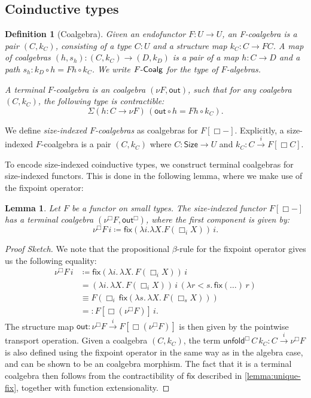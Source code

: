 \documentclass[10pt,a4paper]{article}
\newtheorem{lemma}[theorem]{Lemma}
\newtheorem{definition}[theorem]{Definition}
\theoremstyle{definition}
\theoremstyle{remark}
\renewcommand{\.}{.\,} %
\renewcommand{\:}{:} %
\newcommand{\Size}{\mathsf{Size}}
\newcommand{\fix}{\mathsf{fix}}
\newcommand{\unfold}{\mathsf{unfold}}
\newcommand{\FCoalg}{F\text-\sf{Coalg}}
\newcommand{\sFCoalg}{F[\Box{-}]\text-\sf{CoAlg}}
\newcommand{\out}{\mathsf{out}}
\newcommand{\sto}{\overset{i}{\to}}
\newcommand{\0}{\mathbf{0}}
\newcommand{\1}{\mathbf{1}}
\newcommand\<\langle
\renewcommand\>\rangle
\renewcommand\sf\mathsf
\theoremstyle{remark}
\begin{document}
\subsection{Coinductive types}
\begin{definition}[Coalgebra]
    Given an endofunctor \( F : U \to U \), an \emph{F-coalgebra} is a pair \( (C, k_C) \), consisting of a type \( C : U \) and a structure map \( k_C : C \to FC \). A map of coalgebras \( (h, s_h) : (C, k_C) \to (D, k_D) \) is a pair of a map \( h : C \to D \) and a path \( s_h : k_D \circ h = Fh \circ k_C\). We write $\FCoalg$ for the type of $F$-algebras.

A \emph{terminal $F$-coalgebra} is an coalgebra \( (\nu F, \out) \), such that for any coalgebra \( (C, k_C) \), the following type is contractible: 
\[\Sigma{(h : C \to \nu F)} \, (\out \circ h = Fh \circ k_C).\]
\end{definition}
We define \emph{size-indexed \( F \)-coalgebras} as coalgebras for \( F[\Box -] \). Explicitly, a size-indexed \( F \)-coalgebra is a pair \( (C, k_C) \) where \( C : \Size \to U \) and \( k_C : C \sto F[\Box C] \).

To encode size-indexed coinductive types, we construct terminal coalgebras for size-indexed functors. This is done in the following lemma, where we make use of the fixpoint operator:
\begin{lemma}\label{lemma:coinductive-sized-encoding}
    Let \( F \) be a functor on small types. The size-indexed functor \( F[\Box -] \) has a terminal coalgebra \( (\nu^\Box F, \out^\Box) \), where the first component is given by:
\[
    \nu^\Box F \, i \coloneqq  \fix (\lambda i. \lambda  X. F(\Box_i X)) \, i.
\] 
\end{lemma}
\begin{proof}[Proof Sketch]
    We note that the propositional \( \beta \)-rule for the fixpoint operator gives us the following equality:
    \begin{align*}
        \nu^\Box F \, i &\coloneqq \fix (\lambda i \. \lambda X\. F(\Box_i X)) \, i \\
        &= (\lambda i \. \lambda X\. F(\Box_i X)) \, i \, (\lambda r < s \. \fix (\dots) \, r) \\
        &\equiv F(\Box_i \, \fix (\lambda s \. \lambda X\. F(\Box_s X)) ) \\
        & =: F [\Box (\nu^\Box F)] \, i
    .\end{align*}
    The structure map \( \out : \nu^\Box F \sto F[\Box (\nu^\Box F)] \) is then given by the pointwise transport operation. Given a coalgebra \( (C, k_C) \), the term \( \unfold^\Box \, C \, k_C : C \sto \nu^\Box F \) is also defined using the fixpoint operator in the same way as in the algebra case, and can be shown to be an coalgebra morphism. The fact that it is a terminal coalgebra then follows from the contractibility of \( \fix \!\) described in \autoref{lemma:unique-fix}, together with function extensionality.
\end{proof}
\end{document}
